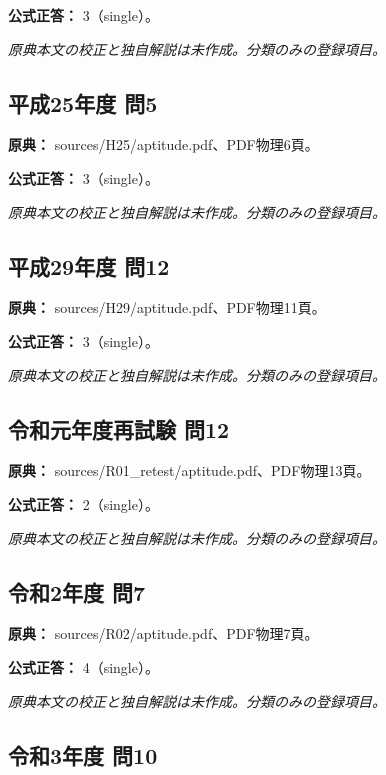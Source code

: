 \textbf{公式正答：} 3（single）。

\par\textit{原典本文の校正と独自解説は未作成。分類のみの登録項目。}

\subsection{平成25年度 問5}
\label{q:h25-reg-apt-05}

\noindent\textbf{原典：} sources/H25/aptitude.pdf、PDF物理6頁。

\textbf{公式正答：} 3（single）。

\par\textit{原典本文の校正と独自解説は未作成。分類のみの登録項目。}

\subsection{平成29年度 問12}
\label{q:h29-reg-apt-12}

\noindent\textbf{原典：} sources/H29/aptitude.pdf、PDF物理11頁。

\textbf{公式正答：} 3（single）。

\par\textit{原典本文の校正と独自解説は未作成。分類のみの登録項目。}

\subsection{令和元年度再試験 問12}
\label{q:r01-ret-apt-12}

\noindent\textbf{原典：} sources/R01\_retest/aptitude.pdf、PDF物理13頁。

\textbf{公式正答：} 2（single）。

\par\textit{原典本文の校正と独自解説は未作成。分類のみの登録項目。}

\subsection{令和2年度 問7}
\label{q:r02-reg-apt-07}

\noindent\textbf{原典：} sources/R02/aptitude.pdf、PDF物理7頁。

\textbf{公式正答：} 4（single）。

\par\textit{原典本文の校正と独自解説は未作成。分類のみの登録項目。}

\subsection{令和3年度 問10}
\label{q:r03-reg-apt-10}

